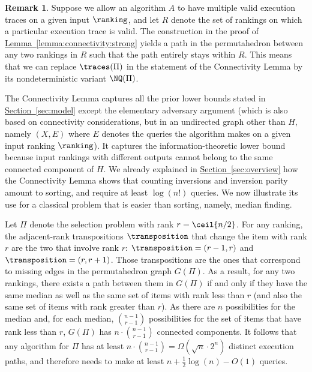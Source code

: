\documentclass[11pt]{article}
\numberwithin{equation}{section}
\theoremstyle{definition}
\newtheorem{remark}[theorem]{Remark}
\theoremstyle{plain}
\newcommand{\expref}[2]{\hyperref[#2]{#1~\ref{#2}}}
\begin{document}
\begin{remark}\label{remark:connectivity}
Suppose we allow an algorithm $A$ to have multiple valid execution traces on a given input $\ranking$, and let $R$ denote the set of rankings on which a particular execution trace is valid. The construction in the proof of \expref{Lemma}{lemma:connectivity:strong} yields a path in the permutahedron between any two rankings in $R$ such that the path entirely stays within $R$. This means that we can replace $\traces(\Pi)$ in the statement of the Connectivity Lemma by its nondeterministic variant $\NQ(\Pi)$.
\end{remark}

The Connectivity Lemma captures all the prior lower bounds stated in \expref{Section}{sec:model} except the elementary adversary argument (which is also based on connectivity considerations, but in an undirected graph other than $H$, namely $(X,E)$ where $E$ denotes the queries the algorithm makes on a given input ranking $\ranking$). It captures the
%
information-theoretic lower bound because input rankings with different outputs cannot belong to the same connected component of $H$. We already explained in \expref{Section}{sec:overview} how the Connectivity Lemma shows that counting inversions and inversion parity amount to sorting, and require at least $\log(n!)$ queries. We now illustrate its use for a classical problem that is easier than sorting, 
%
namely, median finding.  %

Let $\Pi$ denote the selection problem with rank $r = \ceil{n/2}$. For any ranking, the adjacent-rank transpositions $\transposition$ that change the item with rank $r$ are the two that involve rank $r$: $\transposition = (r-1,r)$ and $\transposition = (r,r+1)$. Those transpositions are the ones that correspond to missing edges in the permutahedron graph $G(\Pi)$. As a result, for any two rankings, there exists a path between them in $G(\Pi)$ if and only if they have the same median as well as the same set of items with rank less than $r$ (and also the same set of items with rank greater than $r$). As there are $n$ possibilities for the median and, for each median, $\binom{n-1}{r-1}$ possibilities for the set of items that have rank less than $r$, $G(\Pi)$ has $n \cdot \binom{n-1}{r-1}$ connected components. It follows that any algorithm for $\Pi$ has at least $n \cdot \binom{n-1}{r-1} = \Omega(\sqrt{n}\cdot 2^n)$ distinct execution paths, and therefore needs to make at least $n + \frac{1}{2} \log(n) - O(1)$ queries. 
\end{document}
